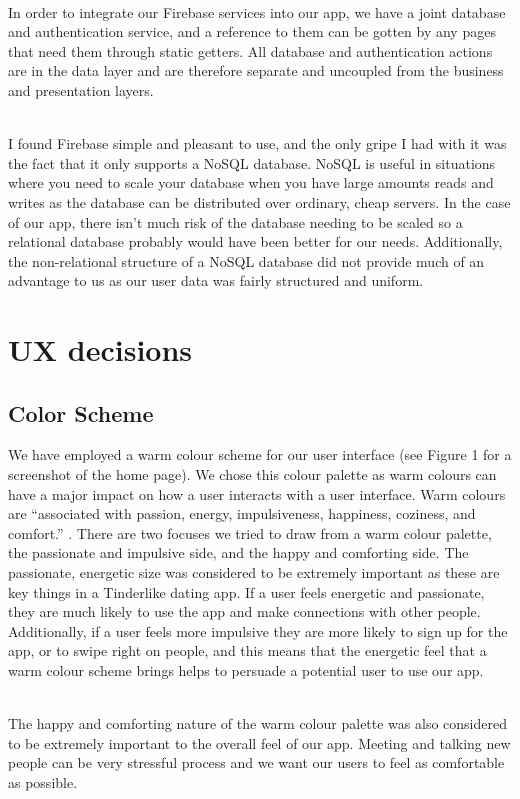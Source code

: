 \documentclass[a4paper, 11pt]{article}
\begin{document}
~\\
In order to integrate our Firebase services into our app, we have a joint database and authentication service, and a reference to them can be gotten by any pages that need them through static getters. All database and authentication actions are in the data layer and are therefore separate and uncoupled from the business and presentation layers.

~\\
I found Firebase simple and pleasant to use, and the only gripe I had with it was the fact that it only supports a NoSQL database. NoSQL is useful in situations where you need to scale your database when you have large amounts reads and writes as the database can be distributed over ordinary, cheap servers. In the case of our app, there isn’t much risk of the database needing to be scaled so a relational database probably would have been better for our needs. Additionally, the non-relational structure of a NoSQL database did not provide much of an advantage to us as our user data was fairly structured and uniform.

\section{UX decisions} 
\subsection{Color Scheme}

We have employed a warm colour scheme for our user interface (see Figure 1 for a screenshot of the home page). We chose this colour palette as warm colours can have a major impact on how a user interacts with a user interface. Warm colours are ``associated with passion, energy, impulsiveness, happiness, coziness, and comfort.” \cite{color}. There are two focuses we tried to draw from a warm colour palette, the passionate and impulsive side, and the happy and comforting side. The passionate, energetic size was considered to be extremely important as these are key things in a Tinderlike dating app. If a user feels energetic and passionate, they are much likely to use the app and make connections with other people. Additionally, if a user feels more impulsive they are more likely to sign up for the app, or to swipe right on people, and this means that the energetic feel that a warm colour scheme brings helps to persuade a potential user to use our app.

~\\
The happy and comforting nature of the warm colour palette was also considered to be extremely important to the overall feel of our app. Meeting and talking new people can be very stressful process and we want our users to feel as comfortable as possible. 
\end{document}
